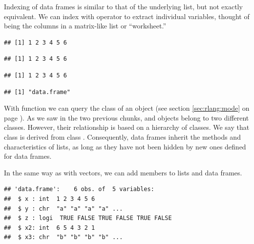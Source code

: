 \documentclass[krantz2]{krantz}\usepackage{knitr}
\begin{document}
Indexing of data frames is similar to that of the underlying list, but not exactly equivalent. We can index with operator \Roperator{[[]]} to extract individual variables, thought of being the columns in a matrix-like list or ``worksheet.''

\begin{knitrout}\footnotesize
{}\color{fgcolor}\begin{kframe}
\begin{alltt}
\hlopt{$}
\end{alltt}
\begin{verbatim}
## [1] 1 2 3 4 5 6
\end{verbatim}
\begin{alltt}
\hlstd{a.df[[}\hlstd{]]}
\end{alltt}
\begin{verbatim}
## [1] 1 2 3 4 5 6
\end{verbatim}
\begin{alltt}
\hlstd{a.df[[}\hlstd{]]}
\end{alltt}
\begin{verbatim}
## [1] 1 2 3 4 5 6
\end{verbatim}
\begin{alltt}
\end{alltt}
\begin{verbatim}
## [1] "data.frame"
\end{verbatim}
\end{kframe}
\end{knitrout}

With function  we can query the class of an \Rlang object (see section \ref{sec:rlang:mode} on page \pageref{sec:rlang:mode}). As we saw in the two previous chunks,  and  objects belong to two different classes. However, their relationship is based on a hierarchy of classes. We say that class  is derived from class . Consequently, data frames inherit the methods and characteristics of lists, as long as they have not been hidden by new ones defined for data frames.

In the same way as with vectors, we can add members to lists and data frames.

\begin{knitrout}\footnotesize
{}\color{fgcolor}\begin{kframe}
\begin{alltt}
\hlopt{$} \hlkwb{<-} \hlopt{:}
\hlopt{$} \hlkwb{<-} 
\end{alltt}
\begin{verbatim}
## 'data.frame':	6 obs. of  5 variables:
##  $ x : int  1 2 3 4 5 6
##  $ y : chr  "a" "a" "a" "a" ...
##  $ z : logi  TRUE FALSE TRUE FALSE TRUE FALSE
##  $ x2: int  6 5 4 3 2 1
##  $ x3: chr  "b" "b" "b" "b" ...
\end{verbatim}
\end{kframe}
\end{knitrout}
\end{document}
